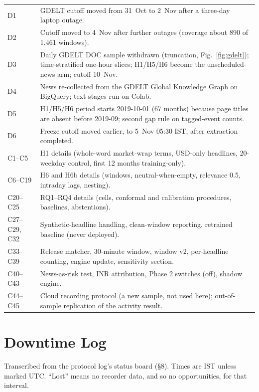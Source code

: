 \documentclass[conference]{IEEEtran}
\begin{document}
\begin{footnotesize}\noindent
\begin{tabular}{@{}p{}p{}@{}}
\toprule
D1 & GDELT cutoff moved from 31~Oct to 2~Nov after a three-day laptop outage.\\
D2 & Cutoff moved to 4~Nov after further outages (coverage about 890 of 1,461 windows).\\
D3 & Daily GDELT DOC sample withdrawn (truncation, Fig.~\ref{fig:gdelt}); time-stratified one-hour slices; H1/H5/H6 become the unscheduled-news arm; cutoff 10~Nov.\\
D4 & News re-collected from the GDELT Global Knowledge Graph on BigQuery; text stages run on Colab.\\
D5 & H1/H5/H6 period starts 2019-10-01 (67 months) because page titles are absent before 2019-09; second gap rule on tagged-event counts.\\
D6 & Freeze cutoff moved earlier, to 5~Nov 05:30 IST, after extraction completed.\\
\midrule
C1--C5 & H1 details (whole-word market-wrap terms, USD-only headlines, 20-weekday control, first 12 months training-only).\\
C6--C19 & H6 and H6b details (windows, neutral-when-empty, relevance 0.5, intraday lags, nesting).\\
C20--C25 & RQ1--RQ4 details (cells, conformal and calibration procedures, baselines, abstentions).\\
C27--C29, C32 & Synthetic-headline handling, clean-window reporting, retrained baseline (never deployed).\\
C33--C39 & Release matcher, 30-minute window, window v2, per-headline counting, engine update, sensitivity section.\\
C40--C43 & News-as-risk test, INR attribution, Phase 2 switches (off), shadow engine.\\
C44--C45 & Cloud recording protocol (a new sample, not used here); out-of-sample replication of the activity result.\\
\bottomrule
\end{tabular}
\end{footnotesize}

\section{Downtime Log}\label{app:downtime}
Transcribed from the protocol log's status board (\S8). Times are IST unless marked UTC. ``Lost''
means no recorder data, and so no opportunities, for that interval.
\end{document}
